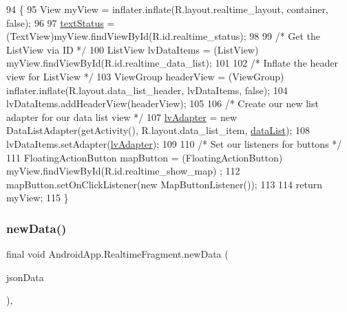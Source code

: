 \begin{DoxyCode}
94                                                                                                       \{
95         View myView = inflater.inflate(R.layout.realtime\_layout, container, \textcolor{keyword}{false});
96 
97         \hyperlink{class_android_app_1_1_realtime_fragment_a8aa6530bcc9c6ef17627f1395ff7910d}{textStatus} = (TextView)myView.findViewById(R.id.realtime\_status);
98 
99         \textcolor{comment}{/* Get the ListView via ID */}
100         ListView lvDataItems = (ListView) myView.findViewById(R.id.realtime\_data\_list);
101 
102         \textcolor{comment}{/* Inflate the header view for ListView */}
103         ViewGroup headerView = (ViewGroup) inflater.inflate(R.layout.data\_list\_header, lvDataItems, \textcolor{keyword}{false});
104         lvDataItems.addHeaderView(headerView);
105 
106         \textcolor{comment}{/* Create our new list adapter for our data list view */}
107         \hyperlink{class_android_app_1_1_realtime_fragment_afeafb95e85d8ba0b9c50aa36af2f4216}{lvAdapter} = \textcolor{keyword}{new} DataListAdapter(getActivity(), R.layout.data\_list\_item, 
      \hyperlink{class_android_app_1_1_realtime_fragment_ab1c4983b61e50b501ed22842253bf849}{dataList});
108         lvDataItems.setAdapter(\hyperlink{class_android_app_1_1_realtime_fragment_afeafb95e85d8ba0b9c50aa36af2f4216}{lvAdapter});
109 
110         \textcolor{comment}{/* Set our listeners for buttons */}
111         FloatingActionButton mapButton = (FloatingActionButton) myView.findViewById(R.id.realtime\_show\_map)
      ;
112         mapButton.setOnClickListener(\textcolor{keyword}{new} MapButtonListener());
113 
114         \textcolor{keywordflow}{return} myView;
115     \}
\end{DoxyCode}
\mbox{\label{class_android_app_1_1_realtime_fragment_a61735e07c8f7b382b176d7cd7443de3f}} 
\subsubsection{\texorpdfstring{new\+Data()}{newData()}}
{\footnotesize\ttfamily final void Android\+App.\+Realtime\+Fragment.\+new\+Data (\begin{DoxyParamCaption}\item[{J\+S\+O\+N\+Object}]{json\+Data }\end{DoxyParamCaption})\hspace{0.3cm}{\ttfamily [inline]}, {\ttfamily [private]}}




